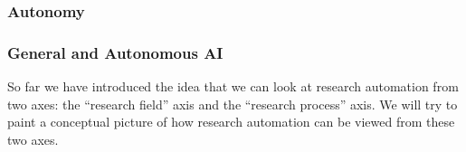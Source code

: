 



\subsubsection{Autonomy}

\subsubsection{General and Autonomous AI}

So far we have introduced the idea that we can look at research automation from two axes: the ``research field'' axis and the ``research process'' axis. We will try to paint a conceptual picture of how research automation can be viewed from these two axes.

